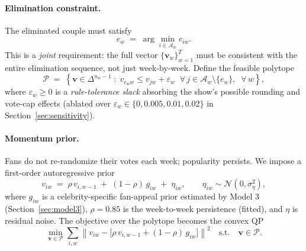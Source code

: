 \documentclass[11pt]{article}
\begin{document}
\paragraph{Elimination constraint.} The eliminated couple must satisfy
\begin{equation}
e_w \;=\; \arg\min_{i \in \mathcal{A}_w} c_{iw}.
\label{eq:elim}
\end{equation}
This is a \emph{joint} requirement: the full vector $\{\mathbf{v}_w\}_{w=1}^{T}$ must be
consistent with the entire elimination sequence, not just week-by-week. Define the feasible
polytope
\begin{equation}
\mathcal{P} \;=\; \left\{ \mathbf{v} \in \Delta^{n_w - 1} \;:\;
v_{e_w w} \leq v_{jw} + \varepsilon_w \;\;\forall\, j \in \mathcal{A}_w \setminus \{e_w\},
\;\; \forall\, w \right\},
\label{eq:polytope}
\end{equation}
where $\varepsilon_w \geq 0$ is a \emph{rule-tolerance slack} absorbing the show's possible
rounding and vote-cap effects (ablated over $\varepsilon_w \in \{0, 0.005, 0.01, 0.02\}$ in
Section~\ref{sec:sensitivity}).

\paragraph{Momentum prior.} Fans do not re-randomize their votes each week; popularity
persists. We impose a first-order autoregressive prior
\begin{equation}
v_{iw} \;=\; \rho\, v_{i,w-1} \;+\; (1-\rho)\, g_{iw} \;+\; \eta_{iw},
\qquad \eta_{iw} \sim \mathcal{N}(0, \sigma^2_\eta),
\label{eq:momentum}
\end{equation}
where $g_{iw}$ is a celebrity-specific fan-appeal prior estimated by Model 3
(Section~\ref{sec:model3}), $\rho = 0.85$ is the week-to-week persistence (fitted), and
$\eta$ is residual noise. The objective over the polytope becomes the convex QP
\begin{equation}
\min_{\mathbf{v} \in \mathcal{P}}
\sum_{i,w} \left\| v_{iw} - \big[\rho\, v_{i,w-1} + (1-\rho)\, g_{iw} \big] \right\|^2
\quad\text{s.t.}\quad \mathbf{v} \in \mathcal{P}.
\label{eq:qp}
\end{equation}
\end{document}
